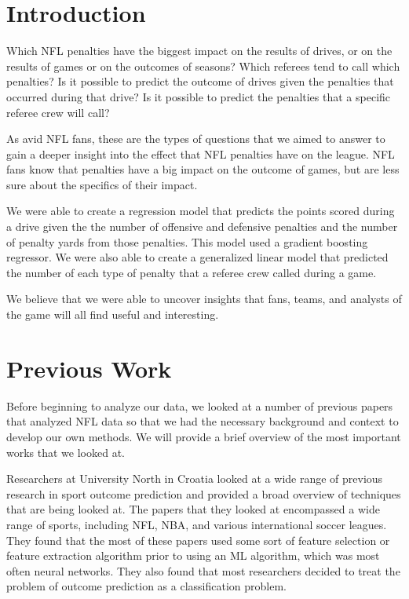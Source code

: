 \documentclass[sigconf, nonacm]{acmart}
\begin{document}
\section{Introduction}

Which NFL penalties have the biggest impact on the results of drives, or on the
results of games or on the outcomes of seasons? Which referees tend to call
which penalties? Is it possible to predict the outcome of drives given the
penalties that occurred during that drive? Is it possible to predict the
penalties that a specific referee crew will call?

As avid NFL fans, these are the types of questions that we aimed to answer to
gain a deeper insight into the effect that NFL penalties have on the league.
NFL fans know that penalties have a big impact on the outcome of games, but are
less sure about the specifics of their impact.

We were able to create a regression model that predicts the points scored during
a drive given the the number of offensive and defensive penalties and the number
of penalty yards from those penalties. This model used a gradient boosting
regressor. We were also able to create a generalized linear model that predicted
the number of each type of penalty that a referee crew called during a game.

We believe that we were able to uncover insights that fans, teams, and analysts
of the game will all find useful and interesting.

\section{Previous Work}

Before beginning to analyze our data, we looked at a number of previous papers
that analyzed NFL data so that we had the necessary background and context to 
develop our own methods. We will provide a brief overview of the most
important works that we looked at.

Researchers at University North in Croatia \cite{Tomislav20} looked at a wide
range of previous research in sport outcome prediction and provided a broad
overview of techniques that are being looked at. The papers that they looked
at encompassed a wide range of sports, including NFL, NBA, and various
international soccer leagues. They found that the most of these papers used some
sort of feature selection or feature extraction algorithm prior to using an ML
algorithm, which was most often neural networks. They also found that most
researchers decided to treat the problem of outcome prediction as a
classification problem.
\end{document}
